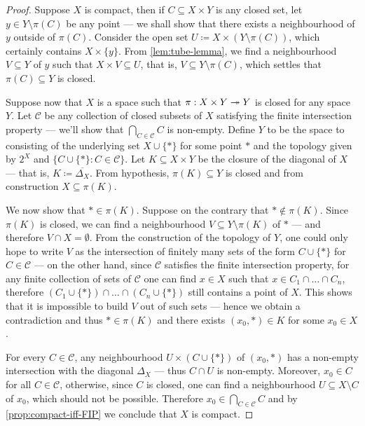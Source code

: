 \begin{proof}
Suppose \(X\) is compact, then if \(C \subseteq X \times Y\) is any closed set,
let \(y \in Y \setminus \pi(C)\) be any point --- we shall show that there
exists a neighbourhood of \(y\) outside of \(\pi(C)\). Consider the open set
\(U \coloneq X \times (Y \setminus \pi(C))\), which certainly contains
\(X \times \{y\}\). From \cref{lem:tube-lemma}, we find a neighbourhood
\(V \subseteq Y\) of \(y\) such that \(X \times V \subseteq U\), that is,
\(V \subseteq Y \setminus \pi(C)\), which settles that \(\pi(C) \subseteq Y\) is
closed.

Suppose now that \(X\) is a space such that \(\pi: X \times Y \twoheadrightarrow Y\) is closed
for any space \(Y\). Let \(\mathcal{C}\) be any collection of closed subsets of
\(X\) satisfying the finite intersection property --- we'll show that
\(\bigcap_{C \in \mathcal{C}} C\) is non-empty. Define \(Y\) to be the space to
consisting of the underlying set \(X \cup \{*\}\) for some point \(*\) and the
topology given by \(2^X\) and \(\{C \cup \{*\} \colon C \in \mathcal{C}\}\). Let
\(K \subseteq X \times Y\) be the closure of the diagonal of \(X\) --- that is,
\(K \coloneq \overline{\Delta_X}\). From hypothesis, \(\pi(K) \subseteq Y\) is
closed and from construction \(X \subseteq \pi(K)\).

We now show that \(* \in \pi(K)\). Suppose on the contrary that
\(* \notin \pi(K)\). Since \(\pi(K)\) is closed, we can find a neighbourhood
\(V \subseteq Y \setminus \pi(K)\) of \(*\) --- and therefore
\(V \cap X = \emptyset\). From the construction of the topology of \(Y\), one
could only hope to write \(V\) as the intersection of finitely many sets of the
form \(C \cup \{*\}\) for \(C \in \mathcal{C}\) --- on the other hand, since
\(\mathcal{C}\) satisfies the finite intersection property, for any finite
collection of sets of \(\mathcal{C}\) one can find \(x \in X\) such that
\(x \in C_1 \cap \dots \cap C_n\), therefore
\((C_1 \cup \{*\}) \cap \dots \cap (C_n \cup \{*\})\) still contains a point of
\(X\). This shows that it is impossible to build \(V\) out of such sets ---
hence we obtain a contradiction and thus \(* \in \pi(K)\) and there exists
\((x_0, *) \in K\) for some \(x_0 \in X\).

For every \(C \in \mathcal{C}\), any neighbourhood \(U \times (C \cup \{*\})\)
of \((x_0, *)\) has a non-empty intersection with the diagonal \(\Delta_X\) ---
thus \(C \cap U\) is non-empty. Moreover, \(x_0 \in C\) for all
\(C \in \mathcal{C}\), otherwise, since \(C\) is closed, one can find a
neighbourhood \(U \subseteq X \setminus C\) of \(x_0\), which should not be
possible. Therefore \(x_0 \in \bigcap_{C \in \mathcal{C}} C\) and by
\cref{prop:compact-iff-FIP} we conclude that \(X\) is compact.
\end{proof}

